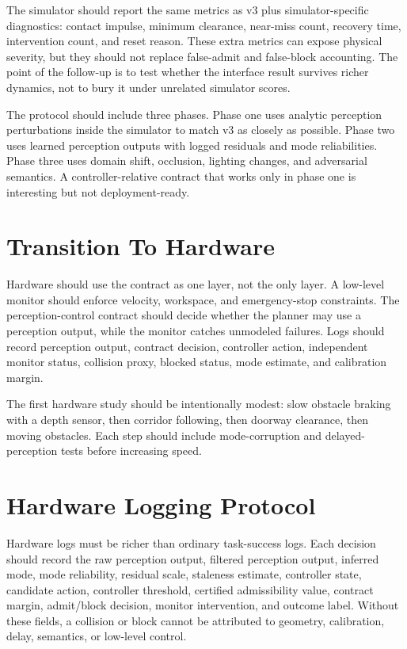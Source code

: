 \documentclass{article}
\begin{document}
The simulator should report the same metrics as v3 plus simulator-specific diagnostics: contact impulse, minimum clearance, near-miss count, recovery time, intervention count, and reset reason. These extra metrics can expose physical severity, but they should not replace false-admit and false-block accounting. The point of the follow-up is to test whether the interface result survives richer dynamics, not to bury it under unrelated simulator scores.

The protocol should include three phases. Phase one uses analytic perception perturbations inside the simulator to match v3 as closely as possible. Phase two uses learned perception outputs with logged residuals and mode reliabilities. Phase three uses domain shift, occlusion, lighting changes, and adversarial semantics. A controller-relative contract that works only in phase one is interesting but not deployment-ready.

\section{Transition To Hardware}

Hardware should use the contract as one layer, not the only layer. A low-level monitor should enforce velocity, workspace, and emergency-stop constraints. The perception-control contract should decide whether the planner may use a perception output, while the monitor catches unmodeled failures. Logs should record perception output, contract decision, controller action, independent monitor status, collision proxy, blocked status, mode estimate, and calibration margin.

The first hardware study should be intentionally modest: slow obstacle braking with a depth sensor, then corridor following, then doorway clearance, then moving obstacles. Each step should include mode-corruption and delayed-perception tests before increasing speed.

\section{Hardware Logging Protocol}

Hardware logs must be richer than ordinary task-success logs. Each decision should record the raw perception output, filtered perception output, inferred mode, mode reliability, residual scale, staleness estimate, controller state, candidate action, controller threshold, certified admissibility value, contract margin, admit/block decision, monitor intervention, and outcome label. Without these fields, a collision or block cannot be attributed to geometry, calibration, delay, semantics, or low-level control.
\end{document}
